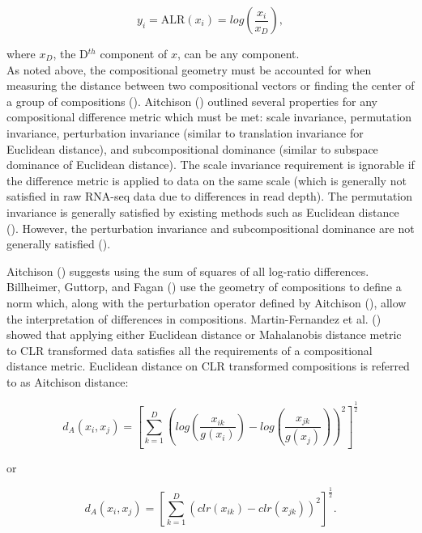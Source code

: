 \documentclass [10pt]{article}
\theoremstyle{definition}
\begin{document}
\begin{equation}
y_i  = \text{ALR}(x_i) = log \left(\frac{x_i}{x_D} \right),
\label{alr}
\end{equation}

where $x_D$, the D$^{th}$ component of $x$, can be any component.  \\  

As noted above, the compositional geometry must be accounted for when measuring the distance between two compositional vectors or finding the center of a group of compositions (\cite{Aitchison2000}).  Aitchison (\citeyear{Aitchison1992}) outlined several properties for any compositional difference metric which must be met: scale invariance, permutation invariance, perturbation invariance (similar to translation invariance for Euclidean distance), and subcompositional dominance (similar to subspace dominance of Euclidean distance).  The scale invariance requirement is ignorable if the difference metric is applied to data on the same scale (which is generally not satisfied in raw RNA-seq data due to differences in read depth). The permutation invariance is generally satisfied by existing methods such as Euclidean distance (\cite{Martin-Fernandez1998}). However, the perturbation invariance and subcompositional dominance are not generally satisfied (\cite{Martin-Fernandez1998}). 

Aitchison (\citeyear{Aitchison1986, Aitchison1992}) suggests using the sum of squares of all log-ratio differences.  Billheimer, Guttorp, and Fagan (\citeyear{Billheimer2001}) use the geometry of compositions to define a norm which, along with the perturbation operator defined by Aitchison (\citeyear{Aitchison1986}), allow the interpretation of differences in compositions. Martin-Fernandez et al. (\citeyear{Martin-Fernandez1998}) showed that applying either Euclidean distance or Mahalanobis distance metric to CLR transformed data satisfies all the requirements of a compositional distance metric. Euclidean distance on CLR transformed compositions is referred to as Aitchison distance:

\begin{equation}
d_A(x_i, x_j) = \left[\sum_{k=1}^D \left( log \left(\frac{x_{ik}}{g(x_i)} \right) - log \left(\frac{x_{jk}}{g(x_j)} \right) \right)^2  \right]^\frac{1}{2}
\label{aitchdist1}
\end{equation}


or

\begin{equation}
d_A(x_i, x_j) = \left[\sum_{k=1}^D \left( clr(x_{ik}) - clr(x_{jk}) \right)^2  \right]^\frac{1}{2}.
\label{aitchdist2}
\end{equation}
\\
\end{document}

